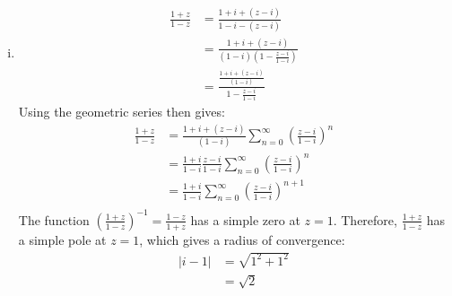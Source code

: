 \documentclass[letterpaper, titlepage, DIV=14]{scrartcl}
\begin{document}
    \begin{enumerate}[i)]
      \item 
      \begin{align*}
        \frac{1+z}{1-z} &= \frac{1+i+(z-i)}{1-i-(z-i)} \\
          &= \frac{1+i+(z-i)}{(1-i)(1 - \frac{z-i}{1-i})} \\
          &= \frac{\frac{1+i+(z-i)}{(1-i)}}{1 - \frac{z-i}{1-i}}
      \end{align*}
      Using the geometric series then gives:
      \begin{align*}
        \frac{1+z}{1-z} &= \frac{1+i+(z-i)}{(1-i)}\sum_{n=0}^{\infty}(\frac{z-i}{1-i})^{n} \\
          &= \frac{1+i}{1-i}\frac{z-i}{1-i}\sum_{n=0}^{\infty}(\frac{z-i}{1-i})^{n} \\
          &= \frac{1+i}{1-i}\sum_{n=0}^{\infty}(\frac{z-i}{1-i})^{n+1} \\
      \end{align*}
      The function $(\frac{1+z}{1-z})^{-1}=\frac{1-z}{1+z}$ has a simple zero at $z=1$. Therefore, $\frac{1+z}{1-z}$ has a simple 
      pole at $z=1$, which gives a radius of convergence:
      \begin{align*}
        |i-1| &= \sqrt{1^{2}+1^{2}} \\
          &= \sqrt{2}
      \end{align*}
      

\end{enumerate}
\end{document}
